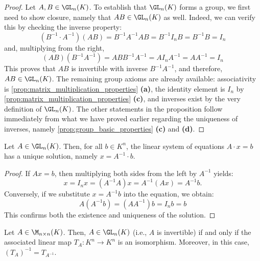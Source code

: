 \begin{proof}
Let $A, B \in \GL_n(K)$. To establish that $\GL_n(K)$ forms a group, we first need to show closure, namely that $AB \in \GL_n(K)$ as well. Indeed, we can verify this by checking the inverse property:
\begin{equation*}
    (B^{-1} \cdot A^{-1})(AB) = B^{-1}A^{-1}AB = B^{-1}I_nB = B^{-1}B = I_n
\end{equation*}
and, multiplying from the right,
\begin{equation*}
    (AB)(B^{-1}A^{-1}) = ABB^{-1}A^{-1} = AI_nA^{-1} = AA^{-1} = I_n
\end{equation*}
This proves that $AB$ is invertible with inverse $B^{-1}A^{-1}$, and therefore, $AB \in \GL_n(K)$. The remaining group axioms are already available: associativity is \cref{prop:matrix_multiplication_properties} \textbf{(a)}, the identity element is $I_n$ by \cref{prop:matrix_multiplication_properties} \textbf{(c)}, and inverses exist by the very definition of $\GL_n(K)$. The other statements in the proposition follow immediately from what we have proved earlier regarding the uniqueness of inverses, namely \cref{prop:group_basic_properties} \textbf{(c)} and \textbf{(d)}.
\end{proof}

\begin{corollary}
\label{cor:unique_solution_via_inverse}
Let $A \in \GL_n(K)$. Then, for all $b \in K^n$, the linear system of equations $A \cdot x = b$ has a unique solution, namely $x = A^{-1} \cdot b$.
\end{corollary}

\begin{proof}
If $Ax = b$, then multiplying both sides from the left by $A^{-1}$ yields:
\begin{equation*}
    x = I_n x = (A^{-1} A) x = A^{-1}(Ax) = A^{-1} b.
\end{equation*}
Conversely, if we substitute $x = A^{-1}b$ into the equation, we obtain:
\begin{equation*}
    A(A^{-1}b) = (AA^{-1})b = I_n b = b
\end{equation*}
This confirms both the existence and uniqueness of the solution.
\end{proof}

\begin{proposition}
\label{prop:invertibility_isomorphism_equivalence}
Let $A \in \M_{n \times n}(K)$. Then, $A \in \GL_n(K)$ (i.e., $A$ is invertible) if and only if the associated linear map $T_A: K^n \to K^n$ is an isomorphism. Moreover, in this case, $(T_A)^{-1} = T_{A^{-1}}$.
\end{proposition}

